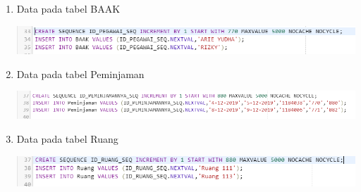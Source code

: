 \documentclass{article}
\begin{document}
\begin{enumerate}
\begin{enumerate}
         \item  Data pada tabel BAAK
         \begin{center}
         \includegraphics[width=.8\textwidth]{Figure/q6.PNG}
         \end{center}
         
         \item  Data pada tabel Peminjaman
         \begin{center}
         \includegraphics[width=.8\textwidth]{Figure/q7.PNG}
         \end{center}
         
         \item  Data pada tabel Ruang
         \begin{center}
         \includegraphics[width=.8\textwidth]{Figure/q8.PNG}
         \end{center}
     \end{enumerate}
     

\end{enumerate}
\end{document}
